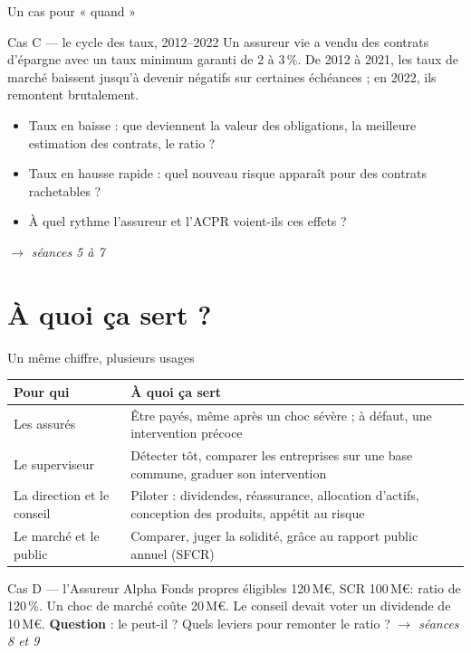 \documentclass[10pt,aspectratio=169]{beamer}
\newenvironment{cas}[2]{\begin{exampleblock}{Cas #1 --- #2}}{\end{exampleblock}}
\begin{document}
\begin{frame}{Un cas pour « quand »}
\begin{cas}{C}{le cycle des taux, 2012--2022}
Un assureur vie a vendu des contrats d'épargne avec un taux minimum garanti de 2 à 3\,\%. De 2012
à 2021, les taux de marché baissent jusqu'à devenir négatifs sur certaines échéances ; en 2022,
ils remontent brutalement.
\begin{itemize}
  \item Taux en baisse : que deviennent la valeur des obligations, la meilleure estimation des
        contrats, le ratio ?
  \item Taux en hausse rapide : quel nouveau risque apparaît pour des contrats rachetables ?
  \item À quel rythme l'assureur et l'ACPR voient-ils ces effets ?
\end{itemize}
\hfill \emph{$\to$ séances 5 à 7}
\end{cas}
\end{frame}

\section{À quoi ça sert ?}

\begin{frame}{Un même chiffre, plusieurs usages}
\begin{table}
\centering
\small
\renewcommand{\arraystretch}{1.4}
\begin{tabular}{p{3.3cm}p{9.7cm}}
\toprule
\textbf{Pour qui} & \textbf{À quoi ça sert} \\
\midrule
Les assurés & Être payés, même après un choc sévère ; à défaut, une intervention précoce \\
Le superviseur & Détecter tôt, comparer les entreprises sur une base commune, graduer son intervention \\
La direction et le conseil & Piloter : dividendes, réassurance, allocation d'actifs, conception des produits, appétit au risque \\
Le marché et le public & Comparer, juger la solidité, grâce au rapport public annuel (SFCR) \\
\bottomrule
\end{tabular}
\end{table}
\vspace{0.2cm}
\begin{cas}{D}{l'Assureur Alpha}
Fonds propres éligibles 120\,M\euro, SCR 100\,M\euro : ratio de 120\,\%. Un choc de marché coûte
20\,M\euro. Le conseil devait voter un dividende de 10\,M\euro. \textbf{Question} : le peut-il ?
Quels leviers pour remonter le ratio ? \hfill \emph{$\to$ séances 8 et 9}
\end{cas}
\end{frame}
\end{document}
